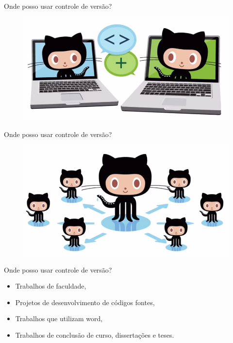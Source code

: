 \documentclass[12pt]{beamer}
\begin{document}
\begin{frame}{Onde posso usar controle de versão?}
	\begin{figure}[!htb]
		\centering
		\includegraphics[scale=0.35]{figuras/fig2.png} 
		\label{fig:fig1} %
	\end{figure}

\end{frame}


\begin{frame}{Onde posso usar controle de versão?}
	\begin{figure}[!htb]
		\centering
		\includegraphics[scale=0.4]{figuras/fig3.png} 
		\label{fig:fig1} %
	\end{figure}

\end{frame}


\begin{frame}{Onde posso usar controle de versão?}
 \begin{itemize}
 \item Trabalhos de faculdade,
 \item Projetos de desenvolvimento de códigos fontes,
 \item Trabalhos que utilizam word,
 \item Trabalhos de conclusão de curso, dissertações e teses.
 \end{itemize}
\end{frame}
\end{document}
